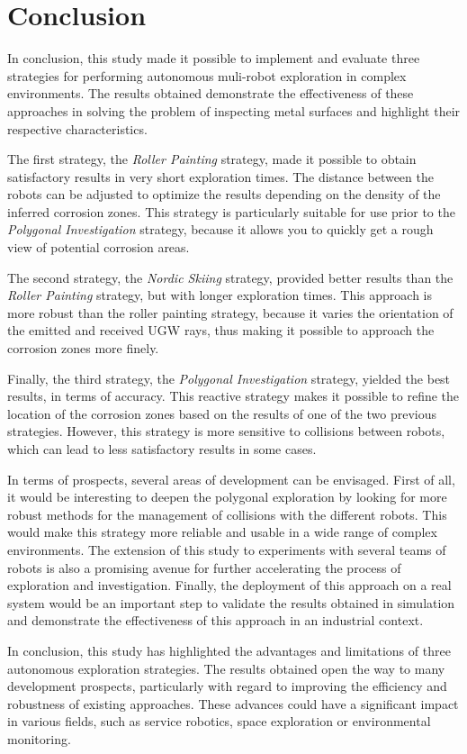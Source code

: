 
\chapter{Conclusion}

In conclusion, this study made it possible to implement and evaluate three strategies for performing autonomous muli-robot exploration in complex environments.
The results obtained demonstrate the effectiveness of these approaches in solving the problem of inspecting metal surfaces and highlight their respective characteristics.

The first strategy, the \textit{Roller Painting} strategy, made it possible to obtain satisfactory results in very short exploration times.
The distance between the robots can be adjusted to optimize the results depending on the density of the inferred corrosion zones.
This strategy is particularly suitable for use prior to the \textit{Polygonal Investigation} strategy, because it allows you to quickly get a rough view of potential corrosion areas.

The second strategy, the \textit{Nordic Skiing} strategy, provided better results than the \textit{Roller Painting} strategy, but with longer exploration times.
This approach is more robust than the roller painting strategy, because it varies the orientation of the emitted and received UGW rays, thus making it possible to approach the corrosion zones more finely.

Finally, the third strategy, the \textit{Polygonal Investigation} strategy, yielded the best results, in terms of accuracy.
This reactive strategy makes it possible to refine the location of the corrosion zones based on the results of one of the two previous strategies.
However, this strategy is more sensitive to collisions between robots, which can lead to less satisfactory results in some cases.

In terms of prospects, several areas of development can be envisaged.
First of all, it would be interesting to deepen the polygonal exploration by looking for more robust methods for the management of collisions with the different robots.
This would make this strategy more reliable and usable in a wide range of complex environments.
The extension of this study to experiments with several teams of robots is also a promising avenue for further accelerating the process of exploration and investigation.
Finally, the deployment of this approach on a real system would be an important step to validate the results obtained in simulation and demonstrate the effectiveness of this approach in an industrial context.

In conclusion, this study has highlighted the advantages and limitations of three autonomous exploration strategies. The results obtained open the way to many development prospects, particularly with regard to improving the efficiency and robustness of existing approaches. These advances could have a significant impact in various fields, such as service robotics, space exploration or environmental monitoring.


